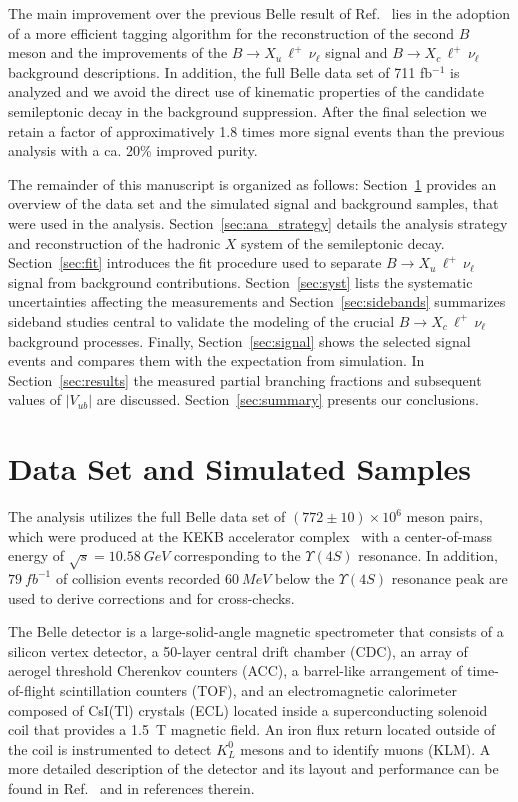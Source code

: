 \documentclass[twocolumn,aps,prd,superscriptaddress,nofootinbib,floatfix,preprintnumbers,a4]{revtex4-1}
\newcommand{\Vub}{V_{ub}}
\newcommand{\bulnu}{\ensuremath{B \to X_u \, \ell^+\, \nu_{\ell}}\xspace}
\newcommand{\bclnu}{\ensuremath{B \to X_c \, \ell^+\, \nu_{\ell}}\xspace}
\begin{document}
The main improvement over the previous Belle result of Ref.~\cite{Urquijo:2009tp} lies in the adoption of a more efficient tagging algorithm for the reconstruction of the second $B$ meson and the improvements of the \bulnu signal and \bclnu background descriptions. In addition, the full Belle data set of 711 fb${}^{-1}$ is analyzed and we avoid the direct use of kinematic properties of the candidate semileptonic decay in the background suppression. After the final selection we retain a factor of approximatively 1.8 times more signal events than the previous analysis with a ca. 20\% improved purity.

The remainder of this manuscript is organized as follows: Section~\ref{sec:data_set_sim_samples} provides an overview of the data set and the simulated signal and background samples, that were used in the analysis. Section~\ref{sec:ana_strategy} details the analysis strategy and reconstruction of the hadronic $X$ system of the semileptonic decay.  Section~\ref{sec:fit} introduces the fit procedure used to separate \bulnu signal from background contributions. Section~\ref{sec:syst} lists the systematic uncertainties affecting the measurements and Section~\ref{sec:sidebands} summarizes sideband studies central to validate the modeling of the crucial \bclnu background processes. Finally, Section~\ref{sec:signal} shows the selected signal events and compares them with the expectation from simulation. In Section~\ref{sec:results}  the measured partial branching fractions and subsequent values of $|\Vub|$ are discussed. Section~\ref{sec:summary} presents our conclusions. 

\section{Data Set and Simulated Samples}\label{sec:data_set_sim_samples}

The analysis utilizes the full Belle data set of \mbox{$(772 \pm 10) \times 10^6$} \PB meson pairs, which were produced at the KEKB accelerator complex~\cite{KEKB} with a center-of-mass energy of $\sqrt{s} = \SI{10.58}{GeV}$ corresponding to the $\Upsilon(4S)$ resonance. In addition, $\SI{79}{fb^{-1}}$ of collision events recorded $\SI{60}{MeV}$ below the $\Upsilon(4S)$ resonance peak are used to derive corrections and for cross-checks.

The Belle detector is a large-solid-angle magnetic spectrometer that consists of a silicon vertex detector, a 50-layer central drift chamber (CDC), an array of aerogel threshold Cherenkov counters (ACC), a barrel-like arrangement of time-of-flight scintillation counters (TOF), and an electromagnetic calorimeter composed of CsI(Tl) crystals (ECL) located inside a superconducting solenoid coil that provides a \SI{1.5}{T} magnetic field. An iron flux return located outside of the coil is instrumented to detect $K^0_L$ mesons and to identify muons (KLM). A more detailed description of the detector and its layout and performance can be found in Ref.~\citep{Abashian:2000cg} and in references therein.
\end{document}

